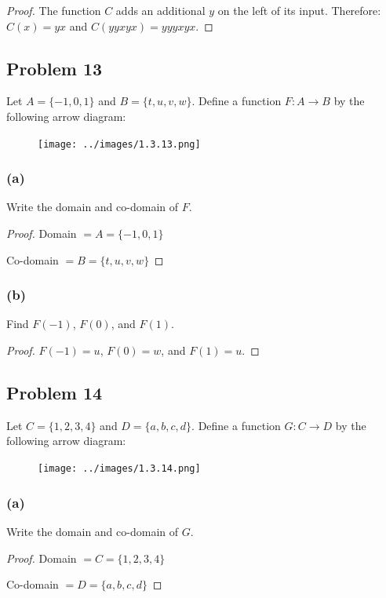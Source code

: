 \documentclass[14pt]{extarticle}
\begin{document}
\begin{proof}
    The function $C$ adds an additional $y$ on the left of its input. Therefore:
    $C(x) = yx$ and $C(yyxyx) = yyyxyx$.
\end{proof}

\subsection{Problem 13}
Let $A = \{-1, 0, 1\}$ and $B = \{t, u, v, w\}$. Define a function $F: A \to B$
by the following arrow diagram:

\begin{figure}[ht!]
    \centering
    \texttt{[image: ../images/1.3.13.png]}
\end{figure}

\subsubsection{(a)}
Write the domain and co-domain of $F$.

\begin{proof}
    Domain $ = A = \{-1, 0, 1\}$

    Co-domain $ = B = \{t, u, v, w\}$
\end{proof}

\subsubsection{(b)}
Find $F(-1)$, $F(0)$, and $F(1)$.

\begin{proof}
    $F(-1) = u$, $F(0) = w$, and $F(1)= u$.
\end{proof}

\subsection{Problem 14}
Let $C = \{1, 2, 3, 4\}$ and $D = \{a, b, c, d\}$. Define a function
$G: C \to D$ by the following arrow diagram:

\begin{figure}[ht!]
    \centering
    \texttt{[image: ../images/1.3.14.png]}
\end{figure}

\subsubsection{(a)}
Write the domain and co-domain of $G$.

\begin{proof}
    Domain $ = C = \{1, 2, 3, 4\}$

    Co-domain $ = D = \{a, b, c, d\}$
\end{proof}
\end{document}
